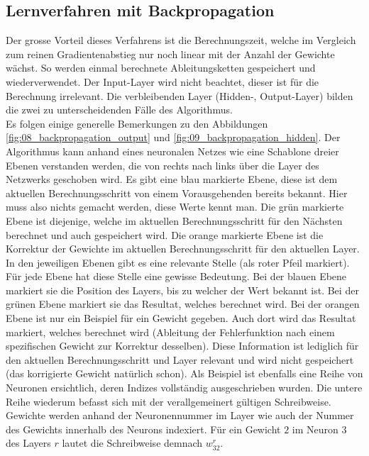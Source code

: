 \newpage
\subsection{Lernverfahren mit Backpropagation}
Der grosse Vorteil dieses Verfahrens ist die Berechnungszeit, welche im Vergleich zum reinen Gradientenabstieg nur noch
linear mit der Anzahl der Gewichte wächst. So werden einmal berechnete Ableitungsketten gespeichert und wiederverwendet.
Der Input-Layer wird nicht beachtet, dieser ist für die Berechnung irrelevant. Die verbleibenden Layer (Hidden-, Output-Layer)
bilden die zwei zu unterscheidenden Fälle des Algorithmus.
\\

Es folgen einige generelle Bemerkungen zu den Abbildungen \ref{fig:08_backpropagation_output} und \ref{fig:09_backpropagation_hidden}.
Der Algorithmus kann anhand eines neuronalen Netzes wie eine Schablone dreier Ebenen verstanden werden, die von rechts
nach links über die Layer des Netzwerks geschoben wird.
Es gibt eine blau markierte Ebene, diese ist dem aktuellen Berechnungsschritt von einem Vorausgehenden bereits bekannt.
Hier muss also nichts gemacht werden, diese Werte kennt man. Die grün markierte Ebene ist diejenige, welche im aktuellen
Berechnungsschritt für den Nächsten berechnet und auch gespeichert wird. Die orange markierte Ebene ist
die Korrektur der Gewichte im aktuellen Berechnungsschritt für den aktuellen Layer. In den jeweiligen Ebenen gibt
es eine relevante Stelle (als roter Pfeil markiert). Für jede Ebene hat diese Stelle eine gewisse Bedeutung. Bei der blauen Ebene markiert sie die
Position des Layers, bis zu welcher der Wert bekannt ist. Bei der grünen Ebene markiert sie das Resultat, welches berechnet
wird. Bei der orangen Ebene ist nur ein Beispiel für ein Gewicht gegeben. Auch dort wird das Resultat markiert, welches
berechnet wird (Ableitung der Fehlerfunktion nach einem spezifischen Gewicht zur Korrektur desselben). Diese Information
ist lediglich für den aktuellen Berechnungsschritt und Layer relevant und wird nicht gespeichert (das korrigierte Gewicht natürlich
schon). Als Beispiel ist ebenfalls eine Reihe von Neuronen ersichtlich, deren Indizes vollständig ausgeschrieben wurden.
Die untere Reihe wiederum befasst sich mit der verallgemeinert gültigen Schreibweise. Gewichte werden anhand der Neuronennummer
im Layer wie auch der Nummer des Gewichts innerhalb des Neurons indexiert. Für ein Gewicht $2$ im Neuron $3$ des Layers
$r$ lautet die Schreibweise demnach $w_{32}^r$.
\\

